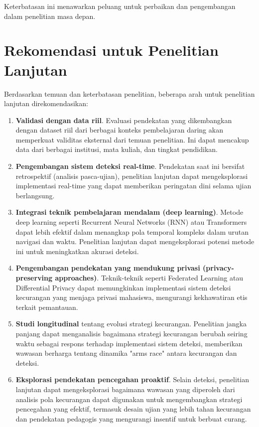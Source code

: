 Keterbatasan ini menawarkan peluang untuk perbaikan dan pengembangan dalam penelitian masa depan.

\section{Rekomendasi untuk Penelitian Lanjutan}
\label{sec:rekomendasi}

Berdasarkan temuan dan keterbatasan penelitian, beberapa arah untuk penelitian lanjutan direkomendasikan:

\begin{enumerate}
    \item \textbf{Validasi dengan data riil}. Evaluasi pendekatan yang dikembangkan dengan dataset riil dari berbagai konteks pembelajaran daring akan memperkuat validitas eksternal dari temuan penelitian. Ini dapat mencakup data dari berbagai institusi, mata kuliah, dan tingkat pendidikan.
    
    \item \textbf{Pengembangan sistem deteksi real-time}. Pendekatan saat ini bersifat retrospektif (analisis pasca-ujian), penelitian lanjutan dapat mengeksplorasi implementasi real-time yang dapat memberikan peringatan dini selama ujian berlangsung.
    
    \item \textbf{Integrasi teknik pembelajaran mendalam (deep learning)}. Metode deep learning seperti Recurrent Neural Networks (RNN) atau Transformers dapat lebih efektif dalam menangkap pola temporal kompleks dalam urutan navigasi dan waktu. Penelitian lanjutan dapat mengeksplorasi potensi metode ini untuk meningkatkan akurasi deteksi.
    
    \item \textbf{Pengembangan pendekatan yang mendukung privasi (privacy-preserving approaches)}. Teknik-teknik seperti Federated Learning atau Differential Privacy dapat memungkinkan implementasi sistem deteksi kecurangan yang menjaga privasi mahasiswa, mengurangi kekhawatiran etis terkait pemantauan.
    
    \item \textbf{Studi longitudinal} tentang evolusi strategi kecurangan. Penelitian jangka panjang dapat menganalisis bagaimana strategi kecurangan berubah seiring waktu sebagai respons terhadap implementasi sistem deteksi, memberikan wawasan berharga tentang dinamika "arms race" antara kecurangan dan deteksi.
    
    \item \textbf{Eksplorasi pendekatan pencegahan proaktif}. Selain deteksi, penelitian lanjutan dapat mengeksplorasi bagaimana wawasan yang diperoleh dari analisis pola kecurangan dapat digunakan untuk mengembangkan strategi pencegahan yang efektif, termasuk desain ujian yang lebih tahan kecurangan dan pendekatan pedagogis yang mengurangi insentif untuk berbuat curang.
\end{enumerate}

